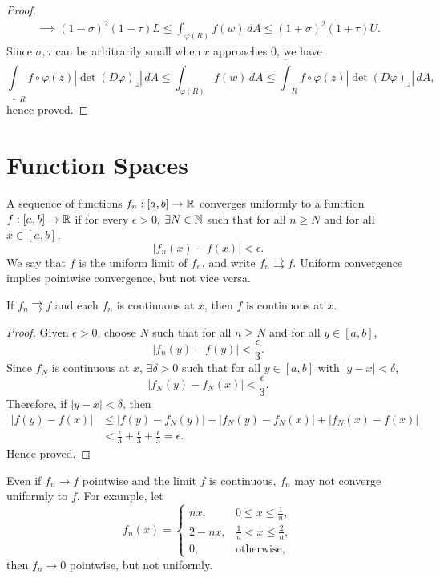 \begin{thm}
\begin{proof}
\begin{gather*}
            \implies (1 - \sigma)^2 (1 - \tau) L \leq \int_{\varphi(R)} f(w) \, dA \leq (1 + \sigma)^2 (1 + \tau) U.
        \end{gather*}
        Since $\sigma, \tau$ can be arbitrarily small when $r$ approaches $0$, we have
        \[
        \underline{\int}_R f \circ \varphi(z) |\det (D\varphi)_z| \, dA \leq \int_{\varphi(R)} f(w) \, dA \leq \overline{\int}_R f \circ \varphi(z) |\det (D\varphi)_z| \, dA,
        \]
        hence proved.
    \end{proof}
\end{thm}

\chapter{Function Spaces}

A sequence of functions $f_n: [a, b] \to {\mathbb R}$ converges uniformly to a function $f: [a, b] \to {\mathbb R}$ if for every $\epsilon > 0$, $\exists N \in {\mathbb N}$ such that for all $n \geq N$ and for all $x \in [a, b]$,
\[
|f_n(x) - f(x)| < \epsilon.
\]
We say that $f$ is the uniform limit of $f_n$, and write $f_n \rightrightarrows f$. Uniform convergence implies pointwise convergence, but not vice versa.

\begin{prop}
    \label{prop:uniform_limit_continuous}
    If $f_n \rightrightarrows f$ and each $f_n$ is continuous at $x$, then $f$ is continuous at $x$.
    \begin{proof}
        Given $\epsilon > 0$, choose $N$ such that for all $n \geq N$ and for all $y \in [a, b]$,
        \[
        |f_n(y) - f(y)| < \frac{\epsilon}{3}.
        \]
        Since $f_N$ is continuous at $x$, $\exists \delta > 0$ such that for all $y \in [a, b]$ with $|y - x| < \delta$,
        \[
        |f_N(y) - f_N(x)| < \frac{\epsilon}{3}.
        \]
        Therefore, if $|y - x| < \delta$, then
        \begin{align*}
            |f(y) - f(x)| &\leq |f(y) - f_N(y)| + |f_N(y) - f_N(x)| + |f_N(x) - f(x)| \\
            &< \frac{\epsilon}{3} + \frac{\epsilon}{3} + \frac{\epsilon}{3} = \epsilon.
        \end{align*}
        Hence proved.
    \end{proof}
\end{prop}

\begin{rmk}
    Even if $f_n \to f$ pointwise and the limit $f$ is continuous, $f_n$ may not converge uniformly to $f$. For example, let
    \[
    f_n(x) = \begin{cases}
        nx, & 0 \leq x \leq \frac1n, \\
        2 - nx, & \frac1n < x \leq \frac2n, \\
        0, & \text{otherwise},
    \end{cases}
    \]
    then $f_n \to 0$ pointwise, but not uniformly.
\end{rmk}

